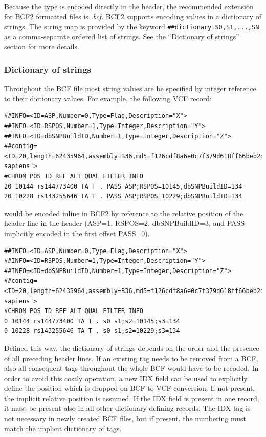 \documentclass[8pt]{article}
\begin{document}
Because the type is encoded directly in the header, the recommended extension for BCF2 formatted files is {\sl .bcf}.
BCF2 supports encoding values in a dictionary of strings.
The string map is provided by the keyword \verb|##dictionary=S0,S1,...,SN| as a comma-separate ordered list of strings.
See the ``Dictionary of strings'' section for more details.

\subsubsection{Dictionary of strings}

Throughout the BCF file most string values are be specified by integer reference to their dictionary values.
For example, the following VCF record:
\small
\begin{verbatim}
##INFO=<ID=ASP,Number=0,Type=Flag,Description="X">
##INFO=<ID=RSPOS,Number=1,Type=Integer,Description="Y">
##INFO=<ID=dbSNPBuildID,Number=1,Type=Integer,Description="Z">
##contig=<ID=20,length=62435964,assembly=B36,md5=f126cdf8a6e0c7f379d618ff66beb2da,species="Homo sapiens">
#CHROM POS ID REF ALT QUAL FILTER INFO
20 10144 rs144773400 TA T . PASS ASP;RSPOS=10145,dbSNPBuildID=134
20 10228 rs143255646 TA T . PASS ASP;RSPOS=10229;dbSNPBuildID=134
\end{verbatim}
\normalsize
would be encoded inline in BCF2 by reference to the relative position of the header line in the header (ASP=1, RSPOS=2, dbSNPBuildID=3, and PASS implicitly encoded in the first offset PASS=0).

\small
\begin{verbatim}
##INFO=<ID=ASP,Number=0,Type=Flag,Description="X">
##INFO=<ID=RSPOS,Number=1,Type=Integer,Description="Y">
##INFO=<ID=dbSNPBuildID,Number=1,Type=Integer,Description="Z">
##contig=<ID=20,length=62435964,assembly=B36,md5=f126cdf8a6e0c7f379d618ff66beb2da,species="Homo sapiens">
#CHROM POS ID REF ALT QUAL FILTER INFO
0 10144 rs144773400 TA T . s0 s1;s2=10145;s3=134
0 10228 rs143255646 TA T . s0 s1;s2=10229;s3=134
\end{verbatim}
\normalsize

Defined this way, the dictionary of strings depends on the order and the presence of all preceding header lines.
If an existing tag needs to be removed from a BCF, also all consequent tags throughout the whole BCF would have to be recoded.
In order to avoid this costly operation, a new IDX field can be used to explicitly define the position which is dropped on BCF-to-VCF conversion.
If not present, the implicit relative position is assumed.
If the IDX field is present in one record, it must be present also in all other dictionary-defining records.
The IDX tag is not necessary in newly created BCF files, but if present, the numbering must match the implicit dictionary of tags.
\end{document}
